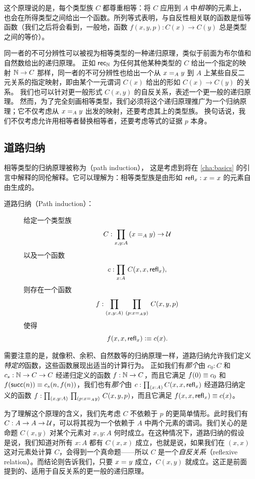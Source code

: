 这个原理说的是，每个类型族 $C$ 都尊重相等：将 $C$ 应用到 $A$ 中\emph{相等}的元素上，也会在所得类型之间给出一个函数。所列等式表明，与自反性相关联的函数是恒等函数（我们之后将会看到，一般地，函数 $f(x,y,p): C(x) \to C(y)$ 总是类型之间的等价）。

同一者的不可分辨性可以被视为相等类型的一种递归原理，类似于前面为布尔值和自然数给出的递归原理。
正如 $\rec{\nat}$ 为任何其他某种类型的 $C$ 给出一个指定的映射 $\nat\to C$ 那样，同一者的不可分辨性也给出一个从 $\id[A] x y$ 到 $A$ 上某些自反二元关系的指定映射，即由某个一元谓词 $C(x)$ 给出的形如 $C(x) \to C(y)$ 的关系。
我们也可以针对更一般形式 $C(x, y)$ 的自反关系，表述一个更一般的递归原理。
然而，为了完全刻画相等类型，我们必须将这个递归原理推广为一个归纳原理；它不仅考虑从 $\id[A] x y$ 出发的映射，还要考虑其上的类型族。
换句话说，我们不仅考虑允许用相等者替换相等者，还要考虑等式的证据 $p$ 本身。
    
\subsection{道路归纳}

相等类型的归纳原理被称为（path induction），
%
%
这是考虑到将在 \cref{cha:basics} 的引言中解释的同伦解释。它可以理解为：相等类型族是由形如 $\refl{x}: \id{x}{x}$ 的元素自由生成的。

\begin{description}
\item[道路归纳（Path induction）：] 
  给定一个类型族
  \[ C : \prd{x,y:A} (\id[A]{x}{y}) \to \UU \]
  以及一个函数
  \[ c :  \prd{x:A} C(x,x,\refl{x}),\]
  则存在一个函数
  \[ f : \prd{x,y:A}{p:\id[A]{x}{y}} C(x,y,p) \]
  使得
  \[ f(x,x,\refl{x}) \defeq c(x). \]
\end{description}

需要注意的是，就像积、余积、自然数等的归纳原理一样，道路归纳允许我们定义\emph{特定的}函数，这些函数展现出适当的计算行为。
正如我们有\emph{那个}由 $c_0:C$ 和 $c_s:\nat \to C \to C$ 经递归定义的函数 $f:\nat\to C$，而且它满足 $f(0)\jdeq c_0$ 和 $f(\suc(n))\jdeq c_s(n,f(n))$，我们也有\emph{那个}由 $c :  \prd{x:A} C(x,x,\refl{x})$ 经道路归纳定义的函数 $f : \dprd{x,y:A}{p:\id[A]{x}{y}} C(x,y,p)$，而且它满足 $f(x,x,\refl{x}) \jdeq c(x)$。

为了理解这个原理的含义，我们先考虑 $C$ 不依赖于 $p$ 的更简单情形。此时我们有 $C:A\to A\to \UU$，可以将其视为一个依赖于 $A$ 中两个元素的谓词。我们关心的是命题 $C(x,y)$ 对某个元素对 $x,y:A$ 何时成立。在这种情况下，道路归纳的假设是说，我们知道对所有 $x:A$ 都有 $C(x,x)$ 成立，也就是说，如果我们在 $(x, x)$ 这对元素处计算 $C$，会得到一个真命题——所以 $C$ 是一个\emph{自反关系}（reflexive relation）。而结论则告诉我们，只要 $\id{x}{y}$ 成立，$C(x,y)$ 就成立。这正是前面提到的、适用于自反关系的更一般的递归原理。

